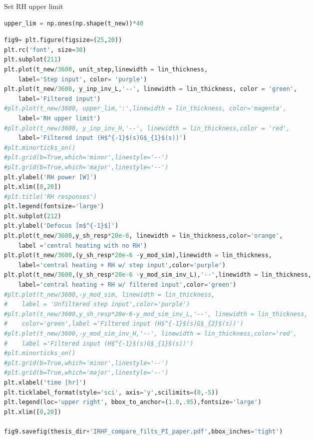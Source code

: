 
\noindent Set RH upper limit

\begin{spacing}{1.2} \begin{lstlisting}[frame=single,language=Python]
upper_lim = np.ones(np.shape(t_new))*40
\end{lstlisting} \end{spacing}

\begin{spacing}{1.2} \begin{lstlisting}[frame=single,language=Python]
fig9= plt.figure(figsize=(25,20))
plt.rc('font', size=30)
plt.subplot(211)
plt.plot(t_new/3600, unit_step,linewidth = lin_thickness,
    label='Step input', color= 'purple')
plt.plot(t_new/3600, y_inp_inv_L,'--', linewidth = lin_thickness, color = 'green',
    label='Filtered input')
#plt.plot(t_new/3600, upper_lim,':',linewidth = lin_thickness, color='magenta', 
    label='RH upper limit')
#plt.plot(t_new/3600, y_inp_inv_H,'--', linewidth = lin_thickness,color = 'red', 
    label='Filtered input (H$^{-1}$(s)G$_{1}$(s))')
#plt.minorticks_on()
#plt.grid(b=True,which='minor',linestyle='--')
#plt.grid(b=True,which='major',linestyle='--')
plt.ylabel('RH power [W]')
plt.xlim([0,20])
#plt.title('RH responses')
plt.legend(fontsize='large')
plt.subplot(212)
plt.ylabel('Defocus [m$^{-1}$]')
plt.plot(t_new/3600,y_sh_resp*20e-6, linewidth = lin_thickness,color='orange',
    label ='central heating with no RH')
plt.plot(t_new/3600,(y_sh_resp*20e-6 -y_mod_sim),linewidth = lin_thickness,
    label='central heating + RH w/ step input',color='purple')
plt.plot(t_new/3600,(y_sh_resp*20e-6 -y_mod_sim_inv_L),'--',linewidth = lin_thickness,
    label='central heating + RH w/ filtered input',color='green')
#plt.plot(t_new/3600,-y_mod_sim, linewidth = lin_thickness,
#    label = 'Unfiltered step input',color='purple')
#plt.plot(t_new/3600,y_sh_resp*20e-6-y_mod_sim_inv_L,'--', linewidth = lin_thickness,
#    color='green',label ='Filtered input (H$^{-1}$(s)G$_{2}$(s))')
#plt.plot(t_new/3600,-y_mod_sim_inv_H,'--', linewidth = lin_thickness,color='red',
#    label ='Filtered input (H$^{-1}$(s)G$_{1}$(s))')
#plt.minorticks_on()
#plt.grid(b=True,which='minor',linestyle='--')
#plt.grid(b=True,which='major',linestyle='--')
plt.xlabel('time [hr]')
plt.ticklabel_format(style='sci', axis='y',scilimits=(0,-5))
plt.legend(loc='upper right', bbox_to_anchor=(1.0,.95),fontsize='large')
plt.xlim([0,20])

fig9.savefig(thesis_dir+'IRHF_compare_filts_PI_paper.pdf',bbox_inches='tight')
\end{lstlisting} \end{spacing}

